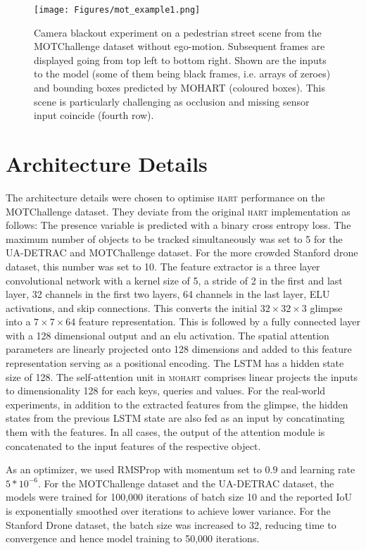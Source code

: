 \appendix
\begin{figure}
	\centering
	\texttt{[image: Figures/mot\_example1.png]}
	\vspace{-6mm}
	\caption{Camera blackout experiment on a pedestrian street scene from the MOTChallenge dataset without ego-motion. Subsequent frames are displayed going from top left to bottom right. Shown are the inputs to the model (some of them being black frames, i.e. arrays of zeroes) and bounding boxes predicted by \textsc{MOHART} (coloured boxes). This scene is particularly challenging as occlusion and missing sensor input coincide (fourth row).
	\vspace{-2mm}}
	\label{fig:blackout1}
\end{figure}
\section{Architecture Details}
\label{sec:architecture_details}
The architecture details were chosen to optimise \textsc{hart} performance on the MOTChallenge dataset. They deviate from the original \textsc{hart} implementation \cite{Kosiorek17} as follows: The presence variable is predicted with a binary cross entropy loss. The maximum number of objects to be tracked simultaneously was set to 5 for the UA-DETRAC and MOTChallenge dataset. For the more crowded Stanford drone dataset, this number was set to 10. The feature extractor is a three layer convolutional network with a kernel size of 5, a stride of 2 in the first and last layer, 32 channels in the first two layers, 64 channels in the last layer, ELU activations, and skip connections. This converts the initial $32 \times 32 \times 3$ glimpse into a $7 \times 7 \times 64$ feature representation. This is followed by a fully connected layer with a 128 dimensional output and an elu activation. The spatial attention parameters are linearly projected onto 128 dimensions and added to this feature representation serving as a positional encoding. The LSTM has a hidden state size of 128. The self-attention unit in \textsc{mohart} comprises linear projects the inputs to dimensionality 128 for each keys, queries and values. For the real-world experiments, in addition to the extracted features from the glimpse, the hidden states from the previous LSTM state are also fed as an input by concatinating them with the features. In all cases, the output of the attention module is concatenated to the input features of the respective object.

As an optimizer, we used RMSProp with momentum set to $0.9$ and learning rate $5*10^{-6}$. For the MOTChallenge dataset and the UA-DETRAC dataset, the models were trained for 100,000 iterations of batch size 10 and the reported IoU is exponentially smoothed over iterations to achieve lower variance. For the Stanford Drone dataset, the batch size was increased to 32, reducing time to convergence and hence model training to 50,000 iterations.

